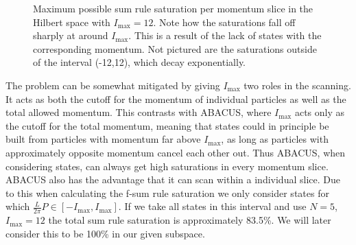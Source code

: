 \documentclass[11pt, a4paper]{report} %
\begin{document}
\begin{figure}[tb!]
  \centering
   \caption{Maximum possible sum rule saturation per momentum slice in the Hilbert space with \(I_{\max}=12\). Note how the saturations fall off sharply at around \(I_{\max}\). This is a result of the lack of states with the corresponding momentum. Not pictured are the saturations outside of the interval (-12,12), which decay exponentially.}\label{fig:saturationsperslice}
\end{figure}


The problem can be somewhat mitigated by giving \(I_{\max}\) two roles in the scanning.
It acts as both the cutoff for the momentum of individual particles as well as the total allowed momentum.
This contrasts with ABACUS, where \(I_{\max}\) acts only as the cutoff for the total momentum, meaning that states could in principle be built from particles with momentum far above \(I_{\max}\), as long as particles with approximately opposite momentum cancel each other out.
Thus ABACUS, when considering states, can always get high saturations in every momentum slice.
ABACUS also has the advantage that it can scan within a individual slice.
Due to this when calculating the f-sum rule saturation we only consider states for which \(\frac{L}{2\pi}P \in [-I_{\max},I_{\max}]\).
If we take all states in this interval and use \(N = 5\), \(I_{\max}=12\) the total sum rule saturation is approximately 83.5\%.
We will later consider this to be 100\% in our given subspace.
\end{document}
